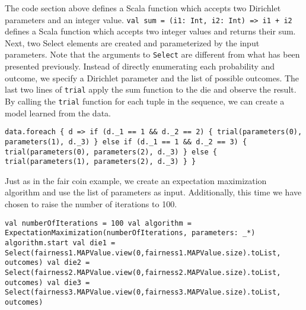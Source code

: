 The code section above defines a Scala function which accepts two Dirichlet parameters and an integer value. \texttt{val sum = (i1: Int, i2: Int) => i1 + i2} defines a Scala function which accepts two integer values and returns their sum.  Next, two Select elements are created and parameterized by the input parameters. Note that the arguments to \texttt{Select} are different from what has been presented previously. Instead of directly enumerating each probability and outcome, we specify a Dirichlet parameter and the list of possible outcomes. The last two lines of \texttt{trial} apply the sum function to the die and observe the result. By calling the \texttt{trial} function for each tuple in the sequence, we can create a model learned from the data.

\begin{flushleft}
\texttt{data.foreach \{ d =>
\newline if (d.\_1 == 1 \&\& d.\_2 == 2) \{
\newline \tab trial(parameters(0), parameters(1), d.\_3)
\newline \tab \} else if (d.\_1 == 1 \&\& d.\_2 == 3) \{
\newline \tab trial(parameters(0), parameters(2), d.\_3)
\newline \} else \{
\newline \tab trial(parameters(1), parameters(2), d.\_3)
\newline \}
\newline \}
}
\end{flushleft}

Just as in the fair coin example, we create an expectation maximization algorithm and use the list of parameters as input. Additionally, this time we have chosen to raise the number of iterations to 100.

\begin{flushleft}
\texttt{val numberOfIterations = 100
\newline val algorithm = ExpectationMaximization(numberOfIterations, parameters: \_*)
\newline algorithm.start
\newline 
\newline val die1 = Select(fairness1.MAPValue.view(0,fairness1.MAPValue.size).toList, outcomes)  
\newline val die2 = Select(fairness2.MAPValue.view(0,fairness2.MAPValue.size).toList, outcomes) 
\newline val die3 = Select(fairness3.MAPValue.view(0,fairness3.MAPValue.size).toList, outcomes) 
}
\end{flushleft}


